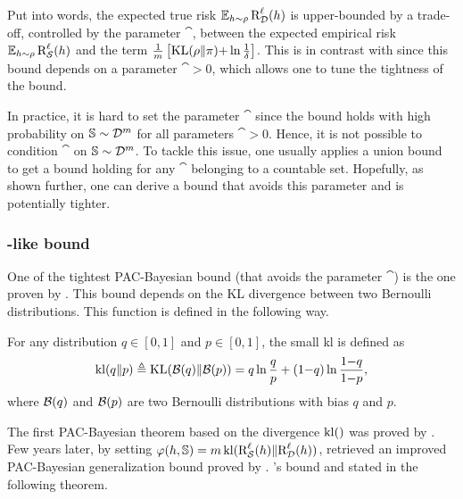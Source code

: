 Put into words, the expected true risk $\operatorname*{\mathbb{E}}_{h\sim\rho}\text{R}^{\ell}_{\mathcal{D}}(h)$ is upper-bounded by a trade-off, controlled by the parameter $\cat$, between the expected empirical risk $\operatorname*{\mathbb{E}}_{h\sim\rho}\text{R}^{\ell}_{\mathcal{S}}(h)$ and the term $\frac{1}{m}\left[ \operatorname{KL}(\rho\|\pi){+}\ln\frac{1}{\delta} \right]$.
This is in contrast with  since this bound depends on a parameter $\cat>0$, which allows one to tune the tightness of the bound.

In practice, it is hard to set the parameter $\cat$ since the bound holds with high probability on $\mathbb{S}\sim\mathcal{D}^m$ for all parameters $\cat>0$. 
Hence, it is not possible to condition $\cat$ on $\mathbb{S}\sim\mathcal{D}^m$. 
To tackle this issue, one usually applies a union bound to get a bound holding for any $\cat$ belonging to a countable set.
Hopefully, as shown further, one can derive a bound that avoids this parameter and is potentially tighter.

\subsubsection{\citeauthor{Seeger2002}-like bound}
\label{chap:pac-bayes:subsubsection:seeger-germain}

One of the tightest PAC-Bayesian bound (that avoids the parameter $\cat$) is the one proven by \citet{Seeger2002}.
This bound depends on the KL divergence between two Bernoulli distributions.
This function is defined in the following way.

\begin{definition}
For any distribution $q\in[0,1]$ and $p\in[0,1]$, the small kl is defined as
\begin{align*}
\operatorname{kl}(q\|p)\triangleq \operatorname{KL}(\mathcal{B}(q)\|\mathcal{B}(p)) = q\ln\frac{q}{p}+(1{-}q)\ln\frac{1{-}q}{1{-}p},
\end{align*}
where $\mathcal{B}(q)$ and $\mathcal{B}(p)$ are two Bernoulli distributions with bias $q$ and $p$. 
\end{definition}

The first PAC-Bayesian theorem based on the divergence $\operatorname{kl}()$ was proved by \citet{Seeger2002}.
Few years later, by setting $\varphi(h,\mathbb{S})=m\operatorname{kl}(\text{R}^{\ell}_{\mathcal{S}}(h)\|\text{R}^{\ell}_{\mathcal{D}}(h))$, \citet{GermainLacasseLavioletteMarchand2009} retrieved an improved PAC-Bayesian generalization bound proved by \citet{Maurer2004}.
\citeauthor{Maurer2004}'s bound and stated in the following theorem.

